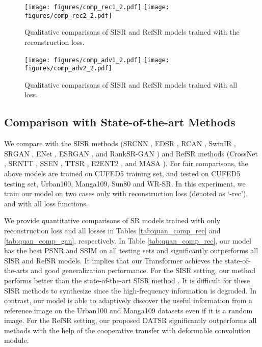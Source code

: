 \documentclass[runningheads]{llncs}
\begin{document}
\begin{figure*}[t]
\centering
\texttt{[image: figures/comp\_rec1\_2.pdf]}
\texttt{[image: figures/comp\_rec2\_2.pdf]}
\caption{Qualitative comparisons of SISR and RefSR models trained with the reconstruction loss.}
\label{fig:qua_comp_rec}
\end{figure*}

\begin{figure*}[t]
\setlength\belowcaptionskip{-10pt}
\centering
\texttt{[image: figures/comp\_adv1\_2.pdf]}
\texttt{[image: figures/comp\_adv2\_2.pdf]}
\caption{Qualitative comparisons of SISR and RefSR models trained with all loss.}
\label{fig:qua_comp_gan}
\end{figure*}


\subsection{Comparison with State-of-the-art Methods}
We compare with the SISR methods (SRCNN \cite{dong2015image}, EDSR \cite{lim2017enhanced}, RCAN \cite{zhang2018image}, SwinIR \cite{liang2021swinir}, SRGAN \cite{ledig2017photo}, ENet \cite{sajjadi2017enhancenet}, ESRGAN \cite{wang2018esrgan}, and RankSR-GAN \cite{zhang2019ranksrgan}) and RefSR methods (CrossNet \cite{zheng2018crossnet},  SRNTT \cite{zhang2019image}, SSEN \cite{Shim_2020_CVPR}, TTSR \cite{yang2020learning}, E2ENT2 \cite{xie2020feature}, and MASA \cite{lu2021masa}). 
For fair comparisons, the above models are trained on CUFED5 training set, and tested on CUFED5 testing set, Urban100, Manga109, Sun80 and WR-SR.
In this experiment, we train our model on two cases only with reconstruction loss (denoted as `-rec'), and with all loss functions.

We provide quantitative comparisons of SR models trained with only reconstruction loss and all losses in Tables \ref{tab:quan_comp_rec} and \ref{tab:quan_comp_gan}, respectively.
In Table \ref{tab:quan_comp_rec}, our model has the best PSNR and SSIM on all testing sets and significantly outperforms all SISR and RefSR models.
It implies that our Transformer achieves the state-of-the-arts and good generalization performance.
For the SISR setting, our method performs better than the state-of-the-art SISR method \cite{liang2021swinir}.
It is difficult for these SISR methods to synthesize   since the high-frequency information is degraded.
In contrast, our model is able to adaptively discover the useful information from a reference image on the Urban100 and Manga109 datasets even if it is a random image. For the RefSR setting, our proposed DATSR significantly outperforms all methods with the help of the cooperative transfer with deformable convolution module.
\end{document}
